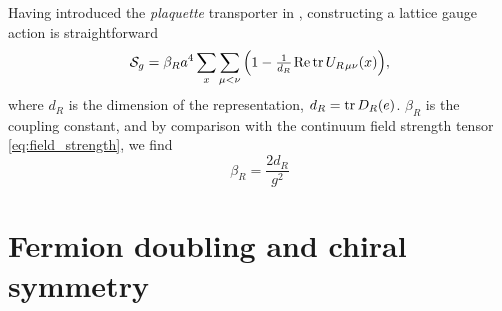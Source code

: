 Having introduced the \emph{plaquette} transporter in
, constructing a lattice gauge action is
straightforward
%
\begin{equation}
  \mathcal{S}_g = \beta_R a^4 \sum_x \sum_{\mu < \nu} \Big( 1 -
    \textstyle\frac{1}{d_R} \hskip.2ex \text{Re} \operatorname{tr} U_{R \hskip.2ex\mu\nu}(x) \Big),
\end{equation}
%
where $d_R$ is the dimension of the representation, $d_R = \operatorname{tr} D_R(e)$. $\beta_R$ is the
coupling constant, and by comparison with the continuum field strength tensor
\eqref{eq:field_strength}, we find
%
\begin{equation}
  \beta_R = \frac{2 d_R}{g^2}
\end{equation}

\section{Fermion doubling and chiral symmetry} \label{sec:fermion_doubling}

